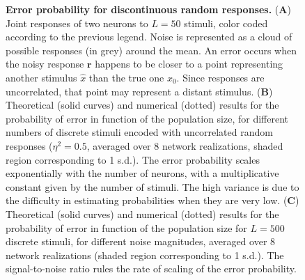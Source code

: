 \documentclass[a4paper]{article}%
\begin{document}
\begin{figure}[ptb]
\centering
{}\caption{\textbf{Error
probability for discontinuous random responses.} (\textbf{A}) Joint responses
of two neurons to $L=50$ stimuli, color coded according to the previous
legend. Noise is represented as a cloud of possible responses (in grey) around
the mean. An error occurs when the noisy response $\mathbf{r}$ happens to
be closer to a point representing another stimulus $\hat{x}$ than the true one
$x_{0}$. Since responses are uncorrelated, that point may represent a distant
stimulus. (\textbf{B}) Theoretical (solid curves) and numerical (dotted) results
for the probability of error in function of the population size, for different
numbers of discrete stimuli encoded with uncorrelated random responses
($\eta^{2}=0.5$, averaged over 8 network realizations, shaded region
corresponding to 1 s.d.). The error probability scales exponentially with the
number of neurons, with a multiplicative constant given by the number of
stimuli. The high variance is due to the difficulty in estimating
probabilities when they are very low. (\textbf{C}) Theoretical (solid curves)
and numerical (dotted) results for the probability of error in function of the
population size for $L=500$ discrete stimuli, for different noise magnitudes,
averaged over 8 network realizations (shaded region corresponding to 1 s.d.).
The signal-to-noise ratio rules the rate of scaling of the error probability.}
\label{Fig:2}
\end{figure}

\clearpage
\end{document}
